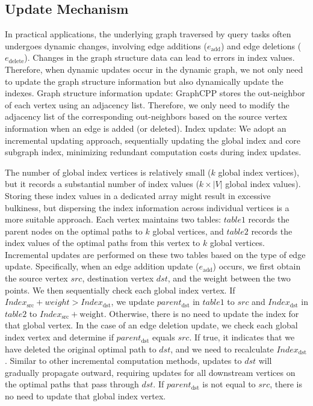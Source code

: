 \documentclass[lettersize,journal]{IEEEtran} %
\begin{document}
\subsection{Update Mechanism}
In practical applications, the underlying graph traversed by query tasks often undergoes dynamic changes, involving edge additions ($e_{\text{add}}$) and edge deletions ($e_{\text{delete}}$). Changes in the graph structure data can lead to errors in index values. Therefore, when dynamic updates occur in the dynamic graph, we not only need to update the graph structure information but also dynamically update the indexes. Graph structure information update: GraphCPP stores the out-neighbor of each vertex using an adjacency list. Therefore, we only need to modify the adjacency list of the corresponding out-neighbors based on the source vertex information when an edge is added (or deleted). Index update: We adopt an incremental updating approach, sequentially updating the global index and core subgraph index, minimizing redundant computation costs during index updates.

The number of global index vertices is relatively small ($k$ global index vertices), but it records a substantial number of index values ($k \times |V|$ global index values). Storing these index values in a dedicated array might result in excessive bulkiness, but dispersing the index information across individual vertices is a more suitable approach. Each vertex maintains two tables: $table1$ records the parent nodes on the optimal paths to $k$ global vertices, and $table2$ records the index values of the optimal paths from this vertex to $k$ global vertices. Incremental updates are performed on these two tables based on the type of edge update. Specifically, when an edge addition update ($e_{\text{add}}$) occurs, we first obtain the source vertex $src$, destination vertex $dst$, and the weight between the two points. We then sequentially check each global index vertex. If $Index_{\text{src}} + weight > Index_{\text{dst}}$, we update $parent_{\text{dst}}$ in $table1$ to $src$ and $Index_{\text{dst}}$ in $table2$ to $Index_{\text{src}} + \text{weight}$. Otherwise, there is no need to update the index for that global vertex. In the case of an edge deletion update, we check each global index vertex and determine if $parent_{\text{dst}}$ equals $src$. If true, it indicates that we have deleted the original optimal path to $dst$, and we need to recalculate $Index_{\text{dst}}$. Similar to other incremental computation methods, updates to $dst$ will gradually propagate outward, requiring updates for all downstream vertices on the optimal paths that pass through $dst$. If $parent_{\text{dst}}$ is not equal to $src$, there is no need to update that global index vertex.
\end{document}
